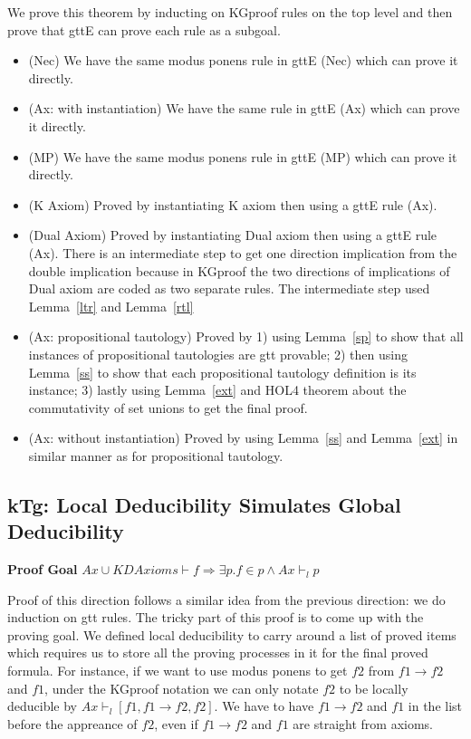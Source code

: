 \documentclass[submission,copyright,creativecommons]{eptcs}
\begin{document}
We prove this theorem by inducting on KGproof rules on the top level and 
then prove that gttE can prove each rule as a subgoal.
\begin{itemize}
 \item (Nec) We have the same modus ponens rule in gttE (Nec) which can prove it directly.
 \item (Ax: with instantiation) We have the same rule in gttE (Ax) which can prove it directly.
 
 \item (MP) We have the same modus ponens rule in gttE (MP) which can prove it directly.

 \item (K Axiom) Proved by instantiating K axiom then using a gttE rule (Ax). 
 
 \item (Dual Axiom) Proved by instantiating Dual axiom then using a gttE rule (Ax). 
 There is an intermediate step to get one direction implication from the 
 double implication because in KGproof the two directions of implications of Dual axiom 
 are coded as two separate rules. The intermediate step used Lemma~\ref{ltr} and Lemma~\ref{rtl}
 
 \item (Ax: propositional tautology) Proved by 1) using Lemma~\ref{sp} to show that all 
 instances of propositional tautologies are gtt provable; 2) then using Lemma~\ref{ss}
 to show that each propositional tautology definition is its instance; 3) lastly using 
 Lemma~\ref{ext} and HOL4 theorem about the commutativity of set unions to 
 get the final proof.

 \item (Ax: without instantiation) Proved by using Lemma~\ref{ss} and Lemma~\ref{ext} in 
 similar manner as for propositional tautology.
 
 
\end{itemize}


\subsection{kTg: Local Deducibility Simulates Global Deducibility}
\textbf{Proof Goal} $Ax \cup KDAxioms \vdash f \Rightarrow \exists p. f \in p \wedge Ax \vdash_l p$


Proof of this direction follows a similar idea from the previous 
direction: we do induction on gtt rules. The tricky 
part of this proof is to come up with the proving goal. 
We defined local deducibility to carry around a list of proved items which 
requires us to store all the proving processes in it for the final 
proved formula. For instance, if we want to use modus ponens to get 
$f2$ from $f1 \rightarrow f2$ and $f1$, under the KGproof notation 
we can only notate $f2$ to be locally deducible by $Ax \vdash_l [f1, f1\rightarrow f2, f2]$.
We have to have $f1 \rightarrow f2$ and $f1$ in the list before the appreance of $f2$, even if 
$f1 \rightarrow f2$ and $f1$ are straight from axioms. 
\end{document}
